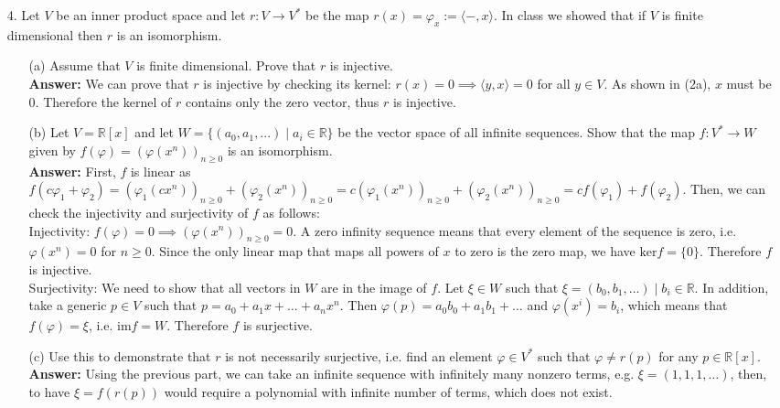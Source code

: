 \documentclass{article}
\begin{document}
\begin{itemize}
\begin{itemize}
	\end{itemize}
	\item [4.] Let $V$ be an inner product space and let $r:V\rightarrow V^*$ be the map $r(x)=\varphi_x:=\langle -,x\rangle$. In class we showed that if $V$ is finite dimensional then $r$ is an isomorphism.
	\begin{itemize}
		\item [(a)] Assume that $V$ is finite dimensional. Prove that $r$ is injective.\\
		\textbf{Answer: } We can prove that $r$ is injective by checking its kernel: $r(x)=0\implies\langle y,x\rangle=0$ for all $y\in V$. As shown in (2a), $x$ must be $0$. Therefore the kernel of $r$ contains only the zero vector, thus $r$ is injective.
		\item [(b)] Let $V=\mathbb{R}[x]$ and let $W=\{(a_0,a_1,...)\mid a_i\in\mathbb{R}\}$ be the vector space of all infinite sequences. Show that the map $\mathit{f}:V^*\rightarrow W$ given by $\mathit{f}(\varphi)=(\varphi(x^n))_{n\geq 0}$ is an isomorphism.\\
		\textbf{Answer: } First, $\mathit{f}$ is linear as $\mathit{f}(c\varphi_1+\varphi_2)=(\varphi_1(cx^n))_{n\geq 0}+(\varphi_2(x^n))_{n\geq 0}=c(\varphi_1(x^n))_{n\geq 0}+(\varphi_2(x^n))_{n\geq 0}=c\mathit{f}(\varphi_1)+\mathit{f}(\varphi_2)$. Then, we can check the injectivity and surjectivity of $\mathit{f}$ as follows:\\
		Injectivity: $f(\varphi)=0 \implies (\varphi(x^n))_{n\geq 0}=0$. A zero infinity sequence means that every element of the sequence is zero, i.e. $\varphi(x^n)=0$ for $n\geq 0$. Since the only linear map that maps all powers of $x$ to zero is the zero map, we have $\text{ker}\mathit{f}=\{0\}$. Therefore $\mathit{f}$ is injective.\\
		Surjectivity: We need to show that all vectors in $W$ are in the image of $\mathit{f}$. Let $\xi\in W$ such that $\xi=(b_0,b_1,\ldots)\mid b_i\in\mathbb{R}$. In addition, take a generic $p\in V$ such that $p=a_0+a_1x+\ldots+a_nx^n$. Then $\varphi(p)=a_0b_0+a_1b_1+\ldots$ and $\varphi(x^i)=b_i$, which means that $\mathit{f}(\varphi)=\xi$, i.e. $\text{im}\mathit{f}=W$. Therefore $\mathit{f}$ is surjective.
		\item [(c)] Use this to demonstrate that $r$ is not necessarily surjective, i.e. find an element $\varphi\in V^*$ such that $\varphi\neq r(p)$ for any $p\in\mathbb{R}[x]$.\\
		\textbf{Answer: } Using the previous part, we can take an infinite sequence with infinitely many nonzero terms, e.g. $\xi=(1,1,1,\ldots)$, then, to have $\xi=\mathit{f}(r(p))$ would require a polynomial with infinite number of terms, which does not exist.

\end{itemize}
\end{itemize}
\end{document}
